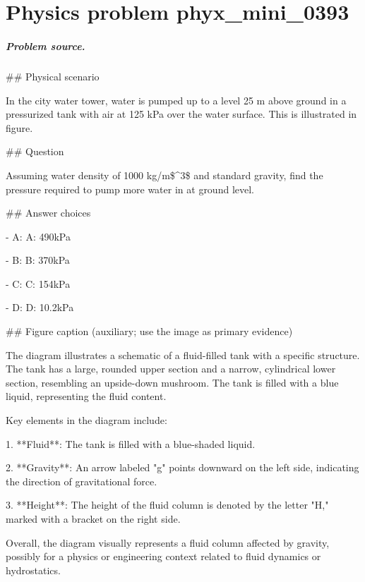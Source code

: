 
\chapter{Physics problem phyx\_mini\_0393}
\label{ch:PhyXMiniProblems_problem_phyx_mini_0393}

\paragraph{Problem source.}
\#\# Physical scenario

In the city water tower, water is pumped up to a level 25 m above ground in a pressurized tank with air at 125 kPa over the water surface. This is illustrated in figure.

\#\# Question

Assuming water density of 1000 kg/m\$\textasciicircum{}3\$ and standard gravity, find the pressure required to pump more water in at ground level.

\#\# Answer choices

- A: A: 490kPa

- B: B: 370kPa

- C: C: 154kPa

- D: D: 10.2kPa

\#\# Figure caption (auxiliary; use the image as primary evidence)

The diagram illustrates a schematic of a fluid-filled tank with a specific structure. The tank has a large, rounded upper section and a narrow, cylindrical lower section, resembling an upside-down mushroom. The tank is filled with a blue liquid, representing the fluid content.

Key elements in the diagram include:

1. **Fluid**: The tank is filled with a blue-shaded liquid.

2. **Gravity**: An arrow labeled "g" points downward on the left side, indicating the direction of gravitational force.

3. **Height**: The height of the fluid column is denoted by the letter "H," marked with a bracket on the right side.

Overall, the diagram visually represents a fluid column affected by gravity, possibly for a physics or engineering context related to fluid dynamics or hydrostatics.

